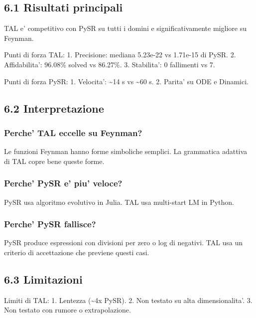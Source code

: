 \documentclass[
]{article}
\begin{document}
\subsection{6.1 Risultati principali}\label{risultati-principali-1}

TAL e' competitivo con PySR su tutti i domini e significativamente
migliore su Feynman.

Punti di forza TAL: 1. Precisione: mediana 5.23e-22 vs 1.71e-15 di PySR.
2. Affidabilita': 96.08\% solved vs 86.27\%. 3. Stabilita': 0 fallimenti
vs 7.

Punti di forza PySR: 1. Velocita': \textasciitilde14 s vs
\textasciitilde60 s. 2. Parita' su ODE e Dinamici.

\subsection{6.2 Interpretazione}\label{interpretazione}

\subsubsection{Perche' TAL eccelle su
Feynman?}\label{perche-tal-eccelle-su-feynman}

Le funzioni Feynman hanno forme simboliche semplici. La grammatica
adattiva di TAL copre bene queste forme.

\subsubsection{Perche' PySR e' piu'
veloce?}\label{perche-pysr-e-piu-veloce}

PySR usa algoritmo evolutivo in Julia. TAL usa multi-start LM in Python.

\subsubsection{Perche' PySR fallisce?}\label{perche-pysr-fallisce}

PySR produce espressioni con divisioni per zero o log di negativi. TAL
usa un criterio di accettazione che previene questi casi.

\subsection{6.3 Limitazioni}\label{limitazioni}

Limiti di TAL: 1. Lentezza (\textasciitilde4x PySR). 2. Non testato su
alta dimensionalita'. 3. Non testato con rumore o extrapolazione.
\end{document}
